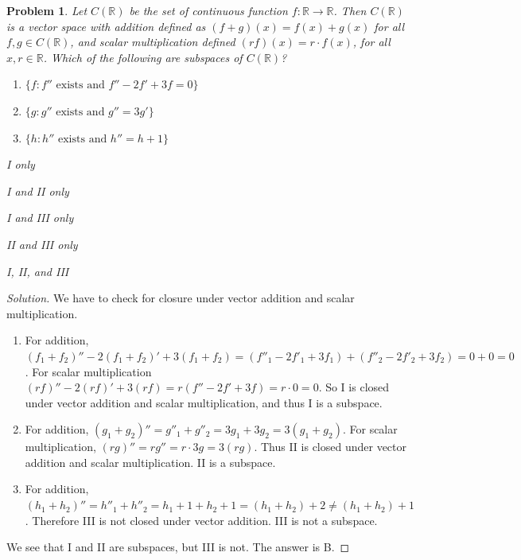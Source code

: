 \documentclass[oneside]{book}
\theoremstyle{mystyle}
\newtheorem{problem}{Problem}[section]
\begin{document}
\begin{problem}
Let $C(\mathbb{R})$ be the set of continuous function $f:\mathbb{R}\rightarrow \mathbb{R}$. Then $C(\mathbb{R})$ is a vector space with addition defined as $(f+g)(x) = f(x)+g(x)$ for all $f,g\in C(\mathbb{R})$, and scalar multiplication defined $(rf)(x) = r\cdot f(x)$, for all $x,r\in \mathbb{R}$. Which of the following are subspaces of $C(\mathbb{R})$?
\begin{enumerate}
    \item[I] $\{f:f''\textrm{ exists and }f'' - 2f'+3f = 0\}$
    \item[II] $\{g:g''\textrm{ exists and }g'' = 3g' \}$
    \item[III] $\{h:h''\textrm{ exists and }h'' = h+1\}$
\end{enumerate}
\begin{enumerate}
    \begin{multicols}{5}
    \item[A.)] I only
    \item[B.)] I and II only
    \item[C.)] I and III only
    \item[D.)] II and III only
    \item[E.)] I, II, and III
    \end{multicols}
\end{enumerate}
\end{problem}
\begin{proof}[Solution]
We have to check for closure under vector addition and scalar multiplication.
\begin{enumerate}
    \item[I] For addition, $(f_1+f_2)'' - 2(f_1+f_2)' +3(f_1+f_2) = (f''_1 - 2f'_1 +3f_1) + (f''_2 - 2f'_2 +3f_2) = 0+0 = 0$. For scalar multiplication $(rf)'' - 2(rf)' +3(rf) = r(f'' - 2f' + 3f) = r\cdot 0 = 0$. So I is closed under vector addition and scalar multiplication, and thus I is a subspace.
    \item For addition, $(g_1+g_2)'' = g''_1 +g''_2 = 3g_1 + 3g_2 = 3(g_1+g_2)$. For scalar multiplication, $(rg)'' =rg'' = r\cdot 3g = 3(rg)$. Thus II is closed under vector addition and scalar multiplication. II is a subspace.
    \item For addition, $(h_1+h_2)'' = h''_1 + h''_2 = h_1+1 + h_2+1 = (h_1+h_2) + 2 \ne (h_1+h_2)+1$. Therefore III is not closed under vector addition. III is not a subspace.
\end{enumerate}
We see that I and II are subspaces, but III is not. The answer is B.
\end{proof}
\end{document}

